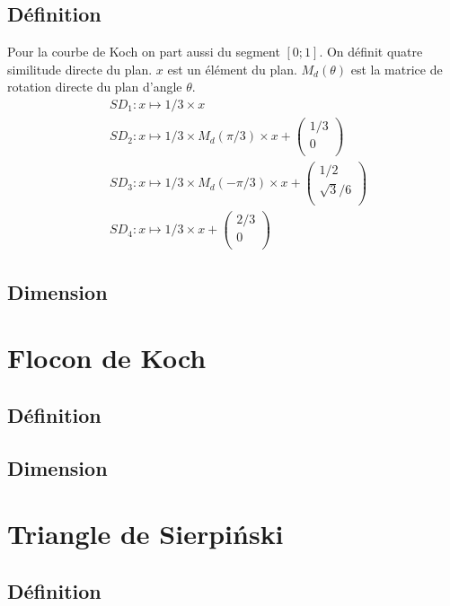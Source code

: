 \documentclass[a4paper, 12pt]{report}
\begin{document}
			\subsection{Définition}
				Pour la courbe de Koch on part aussi du segment $[0;1]$. On définit quatre similitude directe du plan. $x$ est un élément du plan. $M_d(\theta)$ est la matrice de rotation directe du plan d'angle $\theta$.
				\begin{align*}
					&SD_1:x\mapsto 1/3\times x\\
					&SD_2:x\mapsto 1/3\times M_d(\pi/3)\times x+\left(	\begin{array}{ccc}
															1/3\\
															0\\
														\end{array}\right)\\
					&SD_3:x\mapsto 1/3\times M_d(-\pi/3)\times x+\left(	\begin{array}{ccc}
															1/2\\
															\sqrt{3}/6\\
														\end{array}\right)\\
					&SD_4:x\mapsto 1/3\times x+\left(	\begin{array}{ccc}
															2/3\\
															0\\
														\end{array}\right)
				\end{align*}
			\subsection{Dimension}
			
		\section{Flocon de Koch}
			\subsection{Définition}
			\subsection{Dimension}
		\section{Triangle de Sierpiński}
			\subsection{Définition}
\end{document}
